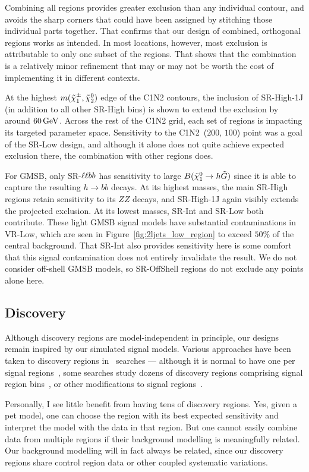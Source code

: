 Combining all regions provides greater exclusion than any individual contour,
and avoids the sharp corners that could have been assigned by stitching those
individual parts together.
That confirms that our design of combined, orthogonal regions works as
intended.
In most locations, however, most exclusion is attributable to only one subset
of the regions.
That shows that the combination is a relatively minor refinement that may or
may not be worth the cost of implementing it in different contexts.

At the highest $m(\chargino_1,\neutralino_2)$ edge of the C1N2 contours,
the inclusion of SR-High-1J (in addition to all other SR-High bins) is shown
to extend the exclusion by around $60\,\eV[G]$.
Across the rest of the C1N2 grid, each set of regions is impacting its targeted
parameter space.
Sensitivity to the C1N2~($200$, $100$) point was a goal of the SR-Low design,
and although it alone does not quite achieve expected exclusion there, the
combination with other regions does.

For GMSB, only SR-$\llbb$ has sensitivity to large
$B(\neutralino_1 \to h \tilde{G})$ since it is able to capture the
resulting $h\to bb$ decays.
At its highest masses, the main SR-High regions retain sensitivity to its
$ZZ$ decays, and SR-High-1J again visibly extends the projected exclusion.
At its lowest masses, SR-Int and SR-Low both contribute.
These light GMSB signal models have substantial contaminations in VR-Low, which
are seen in Figure~\ref{fig:2ljets_low_region} to exceed $50\%$ of the central
background.
That SR-Int also provides sensitivity here is some comfort that this signal
contamination does not entirely invalidate the result.
We do not consider off-shell GMSB models, so SR-OffShell regions do not exclude
any points alone here.


\subsection{Discovery}
\label{sec:2ljets_disco}
Although discovery regions are model-independent in principle, our designs
remain inspired by our simulated signal models.
Various approaches have been taken to discovery regions in \atlas\ searches
--- although it is normal to have one per signal regions~\cite{SUSY-2018-02},
some searches study dozens of discovery regions comprising signal region
bins~\cite{SUSY-2018-36}, or other modifications to signal
regions~\cite{atlas_susy_compressed_2l_2018_run2}.

Personally, I see little benefit from having tens of discovery regions.
Yes, given a pet model, one can choose the region with its best expected
sensitivity and interpret the model with the data in that region.
But one cannot easily combine data from multiple regions if their background
modelling is meaningfully related.
Our background modelling will in fact always be related, since our discovery
regions share control region data or other coupled systematic variations.

